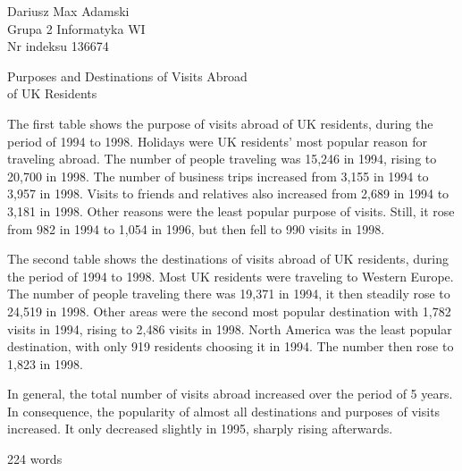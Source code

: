\documentclass[12pt]{article}
\begin{document}
\begin{flushleft} 
	Dariusz Max Adamski \\
	Grupa 2 Informatyka WI\\
	Nr indeksu 136674
\end{flushleft}

\begin{center} 
	\vspace{0.8cm} \Large
	Purposes and Destinations of Visits Abroad \\ of UK Residents
	\vspace{0.5cm}
\end{center}

The first table shows the purpose of visits abroad of UK residents, during the period of 1994 to 1998. Holidays were UK residents' most popular reason for traveling abroad. The number of people traveling was 15,246 in 1994, rising to 20,700 in 1998. The number of business trips increased from 3,155 in 1994 to 3,957 in 1998. Visits to friends and relatives also increased from 2,689 in 1994 to 3,181 in 1998. Other reasons were the least popular purpose of visits. Still, it rose from 982 in 1994 to 1,054 in 1996, but then fell to 990 visits in 1998. 
 
The second table shows the destinations of visits abroad of UK residents, during the period of 1994 to 1998. Most UK residents were traveling to Western Europe. The number of people traveling there was 19,371 in 1994, it then steadily rose to 24,519 in 1998. Other areas were the second most popular destination with 1,782 visits in 1994, rising to 2,486 visits in 1998. North America was the least popular destination, with only 919 residents choosing it in 1994. The number then rose to 1,823 in 1998. 
 
In general, the total number of visits abroad increased over the period of 5 years. In consequence, the popularity of almost all destinations and purposes of visits increased. It only decreased slightly in 1995, sharply rising afterwards. 

224 words
\end{document}
